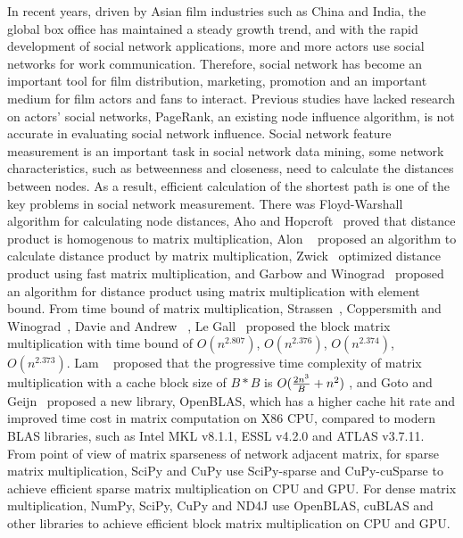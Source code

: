 \documentclass[review]{cvpr}
\begin{document}
In recent years, driven by Asian film industries such as China and India, the global box office has maintained a steady growth trend, and with the rapid development of social network applications, more and more actors use social networks for work communication.
Therefore, social network has become an important tool for film distribution, marketing, promotion and an important medium for film actors and fans to interact.
Previous studies have lacked research on actors' social networks, PageRank, an existing node influence algorithm, is not accurate in evaluating social network influence.
Social network feature measurement is an important task in social network data mining, some network characteristics, such as betweenness and closeness, need to calculate the distances between nodes.
As a result, efficient calculation of the shortest path is one of the key problems in social network measurement.
There was Floyd-Warshall~\cite{floyd1962algorithm,warshall1962theorem} algorithm for calculating node distances, Aho and Hopcroft~\cite{aho1974design} proved that distance product is homogenous to matrix multiplication,
Alon \etal ~\cite{alon1997exponent} proposed an algorithm to calculate distance product by matrix multiplication, Zwick~\cite{zwick2002all} optimized distance product using fast matrix multiplication,
and Garbow and Winograd~\cite{garbow1985scaling} proposed an algorithm for distance product using matrix multiplication with element bound.
From time bound of matrix multiplication, Strassen~\cite{strassen1969gaussian}, Coppersmith and Winograd~\cite{coppersmith1987matrix}, Davie and Andrew ~\cite{davie2013improved}, Le Gall~\cite{le2014powers} proposed the block matrix multiplication with time bound of \(O(n ^ {2.807})\), \(O(n^{2.376})\), \(O(n^{2.374})\), \(O(n^{2.373})\).
Lam \etal ~\cite{lam1991cache} proposed that the progressive time complexity of matrix multiplication with a cache block size of $B*B$ is \(O({2n^3 \over B}+{n^2})\) ,
and Goto and Geijn~\cite{goto2008anatomy} proposed a new library, OpenBLAS, which has a higher cache hit rate and improved time cost in matrix computation on X86 CPU, compared to modern BLAS libraries, such as Intel MKL v8.1.1, ESSL v4.2.0 and ATLAS v3.7.11.
From point of view of matrix sparseness of network adjacent matrix, for sparse matrix multiplication, SciPy  and CuPy  use SciPy-sparse and CuPy-cuSparse to achieve efficient sparse matrix multiplication on CPU and GPU.
For dense matrix multiplication, NumPy, SciPy, CuPy and ND4J use OpenBLAS, cuBLAS and other libraries to achieve efficient block matrix multiplication on CPU and GPU.
\end{document}
